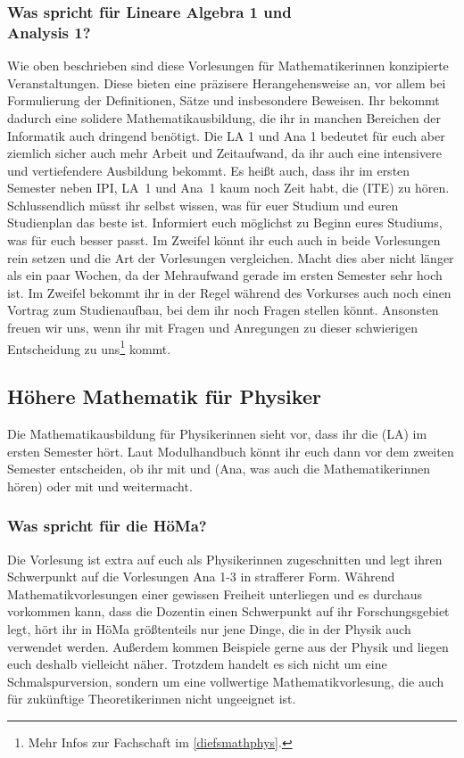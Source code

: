\subsubsection{Was spricht für Lineare Algebra 1 und\\Analysis 1?}
Wie oben beschrieben sind diese Vorlesungen für Mathematikerinnen konzipierte Veranstaltungen. Diese bieten eine präzisere Herangehensweise an, vor allem bei Formulierung der Definitionen, Sätze und insbesondere Beweisen. Ihr bekommt dadurch eine solidere Mathematikausbildung, die ihr in manchen Bereichen der Informatik auch dringend benötigt. Die \gls{LA} 1 und \gls{Ana} 1 bedeutet für euch aber ziemlich sicher auch mehr Arbeit und Zeitaufwand, da ihr auch eine intensivere und vertiefendere Ausbildung bekommt. Es heißt auch, dass ihr im ersten Semester neben \gls{IPI}, \gls{LA}~1 und \gls{Ana}~1 kaum noch Zeit habt, die  (\gls{ITE}) zu hören.\\

Schlussendlich müsst ihr selbst wissen, was für euer Studium und euren Studienplan das beste ist. Informiert euch möglichst zu Beginn eures Studiums, was für euch besser passt. Im Zweifel könnt ihr euch auch in beide Vorlesungen rein setzen und die Art der Vorlesungen vergleichen. Macht dies aber nicht länger als ein paar Wochen, da der Mehraufwand gerade im ersten Semester sehr hoch ist. Im Zweifel bekommt ihr in der Regel während des Vorkurses auch noch einen Vortrag zum Studienaufbau, bei dem ihr noch Fragen stellen könnt. Ansonsten freuen wir uns, wenn ihr mit Fragen und Anregungen zu dieser schwierigen Entscheidung zu uns\footnote{Mehr Infos zur Fachschaft im \autoref{diefsmathphys}.} kommt.

\subsection{Höhere Mathematik für Physiker}
\label{mathephysik}
Die Mathematikausbildung für Physikerinnen sieht vor, dass ihr die  (\gls{LA}) im ersten Semester hört. Laut Modulhandbuch könnt ihr euch dann vor dem zweiten Semester entscheiden, ob ihr mit  und  (\gls{Ana}, was auch die Mathematikerinnen hören) oder mit  und  weitermacht.
\subsubsection{Was spricht für die HöMa?}
Die Vorlesung ist extra auf euch als Physikerinnen zugeschnitten und legt ihren Schwerpunkt auf die Vorlesungen \gls{Ana} 1-3 in strafferer Form. Während Mathematikvorlesungen einer gewissen Freiheit unterliegen und es durchaus vorkommen kann, dass die Dozentin einen Schwerpunkt auf ihr Forschungsgebiet legt, hört ihr in HöMa größtenteils nur jene Dinge, die in der Physik auch verwendet werden. Außerdem kommen Beispiele gerne aus der Physik und liegen euch deshalb vielleicht näher. Trotzdem handelt es sich nicht um eine Schmalspurversion, sondern um eine vollwertige Mathematikvorlesung, die auch für zukünftige Theoretikerinnen nicht ungeeignet ist.

